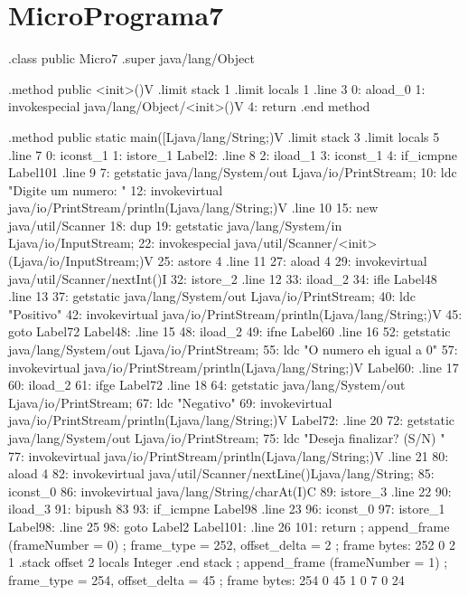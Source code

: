 \documentclass[12pt,a4paper,twoside]{report}
\begin{document}
\section{MicroPrograma7}
\begin{terminal}
.class public Micro7
.super java/lang/Object

.method public <init>()V
  .limit stack 1
  .limit locals 1
  .line 3
  0: aload_0
  1: invokespecial java/lang/Object/<init>()V
  4: return
.end method

.method public static main([Ljava/lang/String;)V
  .limit stack 3
  .limit locals 5
  .line 7
  0: iconst_1
  1: istore_1
Label2:
  .line 8
  2: iload_1
  3: iconst_1
  4: if_icmpne Label101
  .line 9
  7: getstatic java/lang/System/out Ljava/io/PrintStream;
  10: ldc "Digite um numero: "
  12: invokevirtual java/io/PrintStream/println(Ljava/lang/String;)V
  .line 10
  15: new java/util/Scanner
  18: dup
  19: getstatic java/lang/System/in Ljava/io/InputStream;
  22: invokespecial java/util/Scanner/<init>(Ljava/io/InputStream;)V
  25: astore 4
  .line 11
  27: aload 4
  29: invokevirtual java/util/Scanner/nextInt()I
  32: istore_2
  .line 12
  33: iload_2
  34: ifle Label48
  .line 13
  37: getstatic java/lang/System/out Ljava/io/PrintStream;
  40: ldc "Positivo"
  42: invokevirtual java/io/PrintStream/println(Ljava/lang/String;)V
  45: goto Label72
Label48:
  .line 15
  48: iload_2
  49: ifne Label60
  .line 16
  52: getstatic java/lang/System/out Ljava/io/PrintStream;
  55: ldc "O numero eh igual a 0"
  57: invokevirtual java/io/PrintStream/println(Ljava/lang/String;)V
Label60:
  .line 17
  60: iload_2
  61: ifge Label72
  .line 18
  64: getstatic java/lang/System/out Ljava/io/PrintStream;
  67: ldc "Negativo"
  69: invokevirtual java/io/PrintStream/println(Ljava/lang/String;)V
Label72:
  .line 20
  72: getstatic java/lang/System/out Ljava/io/PrintStream;
  75: ldc "Deseja finalizar? (S/N) "
  77: invokevirtual java/io/PrintStream/println(Ljava/lang/String;)V
  .line 21
  80: aload 4
  82: invokevirtual java/util/Scanner/nextLine()Ljava/lang/String;
  85: iconst_0
  86: invokevirtual java/lang/String/charAt(I)C
  89: istore_3
  .line 22
  90: iload_3
  91: bipush 83
  93: if_icmpne Label98
  .line 23
  96: iconst_0
  97: istore_1
Label98:
  .line 25
  98: goto Label2
Label101:
  .line 26
  101: return
  ; append_frame (frameNumber = 0)
  ; frame_type = 252, offset_delta = 2
  ; frame bytes: 252 0 2 1
  .stack
    offset 2
    locals Integer
    .end stack
  ; append_frame (frameNumber = 1)
  ; frame_type = 254, offset_delta = 45
  ; frame bytes: 254 0 45 1 0 7 0 24

\end{terminal}
\end{document}
